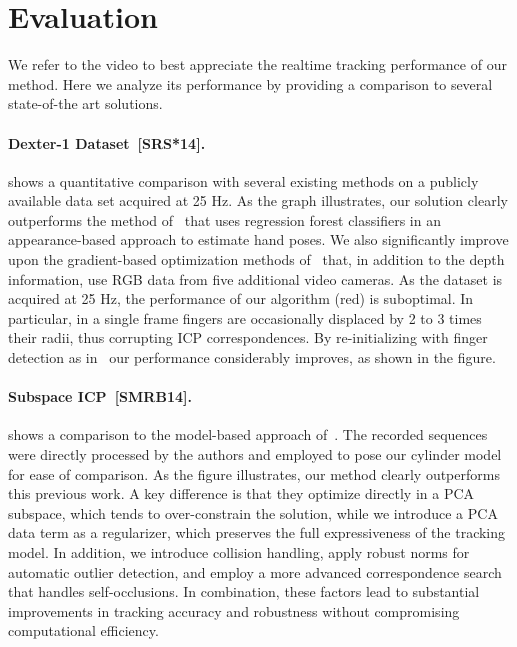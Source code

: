 

\section{Evaluation}
\label{sec:eval}

We refer to the video to best appreciate the realtime tracking performance of our method. Here we analyze its performance by providing a comparison to several state-of-the art solutions.

\paragraph*{Dexter-1 Dataset~[SRS*14].}
 shows a quantitative comparison with several existing methods on a publicly available data set acquired at 25 Hz. As the graph illustrates, our solution clearly outperforms the method of~\cite{tang_cvpr14} that uses regression forest classifiers in an appearance-based approach to estimate hand poses. We also significantly improve upon the gradient-based optimization methods of~\cite{sridhar_iccv13,sridhar_14} that, in addition to the depth information, use RGB data from five additional video cameras.
% 
As the dataset is acquired at 25 Hz, the performance of our algorithm (red) is suboptimal. In particular, in a single frame fingers are occasionally displaced by 2 to 3 times their radii, thus corrupting ICP correspondences. By re-initializing with finger detection as in~\protect\cite{qian_cvpr14} our performance considerably improves, as shown in the figure.


\paragraph*{Subspace ICP~[SMRB14].}
 shows a comparison to the model-based approach of~\cite{schroeder_icra14}. The recorded sequences were directly processed by the authors and employed to pose our cylinder model for ease of comparison.  As the figure illustrates, our method clearly outperforms this previous work.
A key difference is that they optimize directly in a PCA subspace, which tends to over-constrain the solution, while we introduce a PCA data term as a regularizer, which preserves the full expressiveness of the tracking model.
In addition, we introduce collision handling, apply robust norms for automatic outlier detection, and
employ a more advanced correspondence search that handles self-occlusions.
In combination, these factors lead to substantial improvements in tracking accuracy and robustness without compromising computational efficiency.

